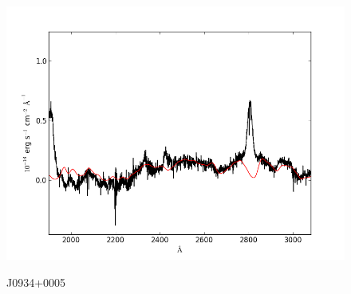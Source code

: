 \documentclass[usenatbib]{mn2e}
\begin{document}
\begin{figure}
\begin{center}
\vspace{5mm}
\includegraphics[width=0.49\linewidth,angle=0]{./red/fe_fit_SBB_8.png}\\

\end{center} 
\caption{J0934+0005 \label{fig:landscape}}   
\end{figure}

\newpage
\end{document}
